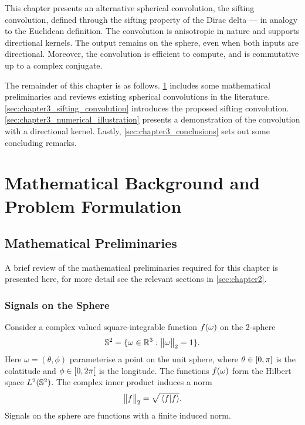 This chapter presents an alternative spherical convolution, the sifting convolution, defined through the sifting property of the Dirac delta --- in analogy to the Euclidean definition.
The convolution is anisotropic in nature and supports directional kernels.
The output remains on the sphere, even when both inputs are directional.
Moreover, the convolution is efficient to compute, and is commutative up to a complex conjugate.

The remainder of this chapter is as follows.
\cref{sec:chapter3_preliminaries} includes some mathematical preliminaries and reviews existing spherical convolutions in the literature.
\cref{sec:chapter3_sifting_convolution} introduces the proposed sifting convolution.
\cref{sec:chapter3_numerical_illustration} presents a demonstration of the convolution with a directional kernel.
Lastly, \cref{sec:chapter3_conclusions} sets out some concluding remarks.

\section{Mathematical Background and Problem Formulation}\label{sec:chapter3_preliminaries}

\subsection{Mathematical Preliminaries}

A brief review of the mathematical preliminaries required for this chapter is presented here, for more detail see the relevant sections in \cref{sec:chapter2}.

\subsubsection{Signals on the Sphere}

Consider a complex valued square-integrable function \(f(\omega)\) on the 2-sphere
%
\begin{equation}
	\mathbb{S}^{2}{}
	= \{\omega \in \mathbb{R}^{3} : {\big\lVert\omega\big\rVert}_{2} = 1\}.
\end{equation}
%
Here \(\omega=(\theta,\phi)\) parameterise a point on the unit sphere, where \(\theta \in \interval{0}{\pi}\) is the colatitude and \(\phi \in \interval[open right]{0}{2\pi}\) is the longitude.
The functions \(f(\omega)\) form the Hilbert space \(L^{2}(\mathbb{S}^{2})\).
The complex inner product induces a norm
%
\begin{equation}
	{\big\lVert f\big\rVert}_{2}
	= \sqrt{\braket*{f}}.
\end{equation}
%
Signals on the sphere are functions with a finite induced norm.

